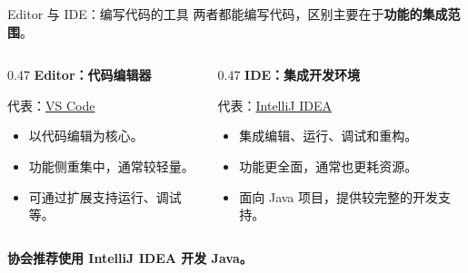 \documentclass[aspectratio=169]{beamer}
\begin{document}
\begin{frame}{Editor 与 IDE：编写代码的工具}
  两者都能编写代码，区别主要在于\textbf{功能的集成范围}。
  \par\bigskip
  \begin{columns}[T,onlytextwidth]
    \begin{column}{0.47\textwidth}
      \textbf{Editor：代码编辑器}
      \par\medskip
      代表：\href{https://code.visualstudio.com/docs}{VS Code}
      \medskip
      \begin{itemize}
        \item 以代码编辑为核心。
        \item 功能侧重集中，通常较轻量。
        \item 可通过扩展支持运行、调试等。
      \end{itemize}
    \end{column}
    \begin{column}{0.47\textwidth}
      \textbf{IDE：集成开发环境}
      \par\medskip
      代表：\href{https://www.jetbrains.com/idea/features/}{IntelliJ IDEA}
      \medskip
      \begin{itemize}
        \item 集成编辑、运行、调试和重构。
        \item 功能更全面，通常也更耗资源。
        \item 面向 Java 项目，提供较完整的开发支持。
      \end{itemize}
    \end{column}
  \end{columns}
  \bigskip
  \alert{\textbf{协会推荐使用 IntelliJ IDEA 开发 Java。}}
\end{frame}
\end{document}
